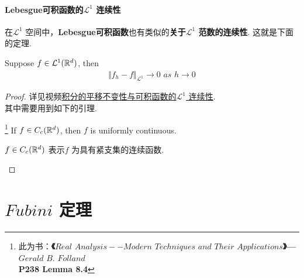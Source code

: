 \vspace{2em}
\paragraph{\textbf{Lebesgue可积函数的$\mathcal{L}^1$ 连续性}}
	在$\mathcal{L}^1$ 空间中，\textbf{Lebesgue可积函数}也有类似的\textbf{关于$\mathcal{L}^1$ 范数的连续性}. 这就是下面的定理.
	\begin{thm}\label{thm 3.4.1}
		Suppose $f \in \mathcal{L}^{1}(\mathbb{R}^d)$, then
		\begin{align}
			\Vert f_h - f \Vert_{\mathcal{L}^1} \to 0 \,\, as \,\, h \to 0
		\end{align}
		
		\vspace{2em}
		\begin{proof}
			详见视频\href{https://www.bilibili.com/video/BV1FT411C7wM?p=25}{积分的平移不变性与可积函数的$\mathcal{L}^1$ 连续性}. \\
			其中需要用到如下的引理.
			\begin{lemma}\label{lemma 3.4.2}\footnote{此为书：\textbf{《$Real \,\, Analysis -- Modern \,\, Techniques \,\, and \,\, Their \,\, Applications$》--- $Gerald \,\, B. \,\, Folland$} \\
					\textbf{P238 Lemma 8.4}}
				If $f \in C_{c}(\mathbb{R}^d)$, then $f$ is uniformly continuous.
				
				\vspace{1em}
				\begin{rmk}
					$f \in C_{c}(\mathbb{R}^d)$ 表示$f$ 为具有紧支集的连续函数.
				\end{rmk}
			\end{lemma}
		\end{proof}
	\end{thm}

\newpage
\section{$Fubini$ 定理}



	\ifx\allfiles\undefined

\fi